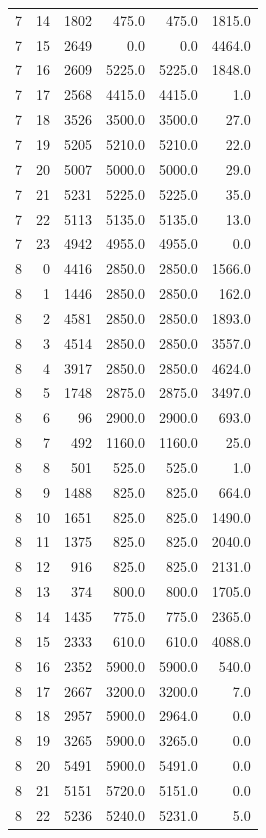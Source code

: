 \begin{longtable}{rrrrrr}
7 & 14 & 1802 & 475.0 & 475.0 & 1815.0\\
7 & 15 & 2649 & 0.0 & 0.0 & 4464.0\\
7 & 16 & 2609 & 5225.0 & 5225.0 & 1848.0\\
7 & 17 & 2568 & 4415.0 & 4415.0 & 1.0\\
7 & 18 & 3526 & 3500.0 & 3500.0 & 27.0\\
7 & 19 & 5205 & 5210.0 & 5210.0 & 22.0\\
7 & 20 & 5007 & 5000.0 & 5000.0 & 29.0\\
7 & 21 & 5231 & 5225.0 & 5225.0 & 35.0\\
7 & 22 & 5113 & 5135.0 & 5135.0 & 13.0\\
7 & 23 & 4942 & 4955.0 & 4955.0 & 0.0\\
8 & 0 & 4416 & 2850.0 & 2850.0 & 1566.0\\
8 & 1 & 1446 & 2850.0 & 2850.0 & 162.0\\
8 & 2 & 4581 & 2850.0 & 2850.0 & 1893.0\\
8 & 3 & 4514 & 2850.0 & 2850.0 & 3557.0\\
8 & 4 & 3917 & 2850.0 & 2850.0 & 4624.0\\
8 & 5 & 1748 & 2875.0 & 2875.0 & 3497.0\\
8 & 6 & 96 & 2900.0 & 2900.0 & 693.0\\
8 & 7 & 492 & 1160.0 & 1160.0 & 25.0\\
8 & 8 & 501 & 525.0 & 525.0 & 1.0\\
8 & 9 & 1488 & 825.0 & 825.0 & 664.0\\
8 & 10 & 1651 & 825.0 & 825.0 & 1490.0\\
8 & 11 & 1375 & 825.0 & 825.0 & 2040.0\\
8 & 12 & 916 & 825.0 & 825.0 & 2131.0\\
8 & 13 & 374 & 800.0 & 800.0 & 1705.0\\
8 & 14 & 1435 & 775.0 & 775.0 & 2365.0\\
8 & 15 & 2333 & 610.0 & 610.0 & 4088.0\\
8 & 16 & 2352 & 5900.0 & 5900.0 & 540.0\\
8 & 17 & 2667 & 3200.0 & 3200.0 & 7.0\\
8 & 18 & 2957 & 5900.0 & 2964.0 & 0.0\\
8 & 19 & 3265 & 5900.0 & 3265.0 & 0.0\\
8 & 20 & 5491 & 5900.0 & 5491.0 & 0.0\\
8 & 21 & 5151 & 5720.0 & 5151.0 & 0.0\\
8 & 22 & 5236 & 5240.0 & 5231.0 & 5.0\\

\end{longtable}

